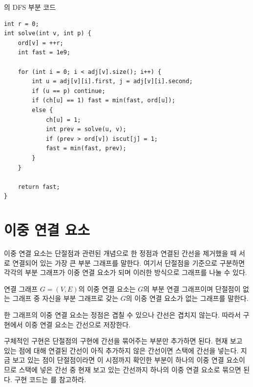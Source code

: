 \begin{code} \label{code: articulation-bridge}
의 DFS 부분 코드
\begin{lstlisting}
int r = 0;
int solve(int v, int p) {
    ord[v] = ++r;
    int fast = 1e9;
    
    for (int i = 0; i < adj[v].size(); i++) {
        int u = adj[v][i].first, j = adj[v][i].second;
        if (u == p) continue;
        if (ch[u] == 1) fast = min(fast, ord[u]);
        else {
            ch[u] = 1;
            int prev = solve(u, v);
            if (prev > ord[v]) iscut[j] = 1;
            fast = min(fast, prev);
        }
    }
    
    return fast;
}
\end{lstlisting}
\end{code}

\section{이중 연결 요소}
이중 연결 요소는 단절점과 관련된 개념으로 한 정점과 연결된 간선을 제거했을 때 서로 연결되어 있는 가장 큰 부분 그래프를 말한다. 여기서 단절점을 기준으로 구분하면 각각의 부분 그래프가 이중 연결 요소가 되며 이러한 방식으로 그래프를 나눌 수 있다.

\begin{definition}[이중 연결 요소]
    연결 그래프 $G=(V, E)$의 이중 연결 요소는 $G$의 부분 연결 그래프이며 단절점이 없는 그래프 중 자신을 부분 그래프로 갖는 $G$의 이중 연결 요소가 없는 그래프를 말한다.
\end{definition}

한 그래프의 이중 연결 요소는 정점은 겹칠 수 있으나 간선은 겹치지 않는다. 따라서 구현에서 이중 연결 요소는 간선으로 저장한다.

구체적인 구현은 단절점의 구현에 간선을 묶어주는 부분만 추가하면 된다. 현재 보고 있는 점에 대해 연결된 간선이 아직 추가하지 않은 간선이면 스택에 간선을 넣는다. 지금 보고 있는 점이 단절점이라면 이 시점까지 확인한 부분이 하나의 이중 연결 요소이므로 스택에 넣은 간선 중 현재 보고 있는 간선까지 하나의 이중 연결 요소로 묶으면 된다.
구현 코드는 를 참고하라.


